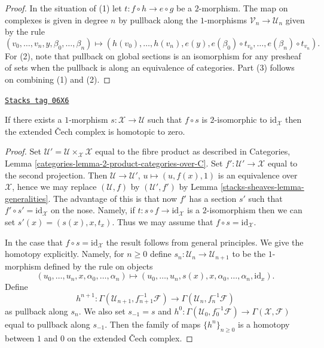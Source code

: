 \begin{proof}
In the situation of (1) let $t : f \circ h \to e \circ g$ be a $2$-morphism.
The map on complexes is given in degree $n$ by
pullback along the $1$-morphisms
$\mathcal{V}_n \to \mathcal{U}_n$ given by the rule
$$
(v_0, \ldots, v_n, y, \beta_0, \ldots, \beta_n)
\longmapsto
(h(v_0), \ldots, h(v_n), e(y),
e(\beta_0) \circ t_{v_0}, \ldots, e(\beta_n) \circ t_{v_n}).
$$
For (2), note that pullback on global sections is an isomorphism
for any presheaf of sets when the pullback is along an equivalence
of categories. Part (3) follows on combining (1) and (2).
\end{proof}

\begin{lemma}[Homotopy]
\label{stacks-sheaves-lemma-homotopy}
\href{https://stacks.math.columbia.edu/tag/06X6}{\texttt{Stacks tag 06X6}}

If there exists a $1$-morphism $s : \mathcal{X} \to \mathcal{U}$
such that $f \circ s$ is $2$-isomorphic to $\text{id}_\mathcal{X}$
then the extended {\v C}ech complex is homotopic to zero.
\end{lemma}

\begin{proof}
Set $\mathcal{U}' = \mathcal{U} \times_\mathcal{X} \mathcal{X}$
equal to the fibre product as described in
Categories, Lemma \ref{categories-lemma-2-product-categories-over-C}.
Set $f' : \mathcal{U}' \to \mathcal{X}$ equal to the second projection.
Then $\mathcal{U} \to \mathcal{U}'$, $u \mapsto (u, f(x), 1)$
is an equivalence over $\mathcal{X}$, hence we may replace
$(\mathcal{U}, f)$ by $(\mathcal{U}', f')$ by
Lemma \ref{stacks-sheaves-lemma-generalities}.
The advantage of this is that now $f'$ has a section $s'$ such
that $f' \circ s' = \text{id}_\mathcal{X}$ on the nose. Namely, if
$t : s \circ f \to \text{id}_\mathcal{X}$ is a $2$-isomorphism
then we can set $s'(x) = (s(x), x, t_x)$. Thus we may assume that
$f \circ s = \text{id}_\mathcal{X}$.

\medskip\noindent
In the case that $f \circ s = \text{id}_\mathcal{X}$ the result follows
from general principles. We give the homotopy explicitly. Namely,
for $n \geq 0$ define $s_n : \mathcal{U}_n \to \mathcal{U}_{n + 1}$
to be the $1$-morphism defined by the rule on objects
$$
(u_0, \ldots, u_n, x, \alpha_0, \ldots, \alpha_n)
\longmapsto
(u_0, \ldots, u_n, s(x), x,
\alpha_0, \ldots, \alpha_n, \text{id}_x).
$$
Define
$$
h^{n + 1} :
\Gamma(\mathcal{U}_{n + 1}, f_{n + 1}^{-1}\mathcal{F})
\longrightarrow
\Gamma(\mathcal{U}_n, f_n^{-1}\mathcal{F})
$$
as pullback along $s_n$. We also set $s_{-1} = s$ and
$h^0 : \Gamma(\mathcal{U}_0, f_0^{-1}\mathcal{F}) \to
\Gamma(\mathcal{X}, \mathcal{F})$ equal to pullback along $s_{-1}$.
Then the family of maps $\{h^n\}_{n \geq 0}$ is a homotopy between
$1$ and $0$ on the extended {\v C}ech complex.
\end{proof}

